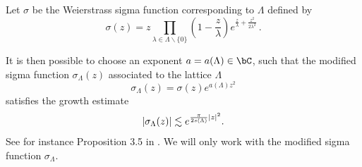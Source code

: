 \documentclass[12pt]{amsart}
\theoremstyle{plain}
\numberwithin{equation}{section}
\begin{document}
Let $\sigma $ be the Weierstrass sigma function corresponding to $\Lambda $
defined by 
\begin{equation*}
\sigma (z) = z\prod_{\lambda \in \Lambda \backslash \{0\}}\left( 1-\frac{z}{
\lambda }\right) e^{\frac{z}{\lambda }+\frac{z^{2}}{2\lambda ^{2}}} \, . 
\end{equation*}



It is then possible to choose an exponent $a = a(\Lambda ) \in \bC $, such
that the modified sigma function $\sigma  _{\Lambda }(z)$ associated to the
lattice $\Lambda $ 
\begin{equation*}
\sigma _{\Lambda }(z)=\sigma (z)e^{a\left( \Lambda \right) z^{2}}\text{}
\end{equation*}
satisfies the growth estimate 
\begin{equation}  \label{eq:c3}
\left\vert \sigma _{\Lambda }(z)\right\vert \lesssim e^{\frac{\pi }{%
2s(\Lambda )}\left\vert z\right\vert ^{2}}\text{.}
\end{equation}
See for instance Proposition 3.5 in \cite{CharlyYurasuper}. We will only
work with the modified sigma function $\sigma _\Lambda $.
\end{document}
